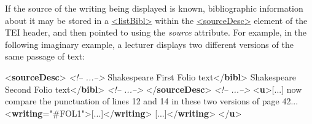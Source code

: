 If the source of the writing being displayed is known, bibliographic information about it may be stored in a \hyperref[TEI.listBibl]{<listBibl>} within the \hyperref[TEI.sourceDesc]{<sourceDesc>} element of the TEI header, and then pointed to using the {\itshape source} attribute. For example, in the following imaginary example, a lecturer displays two different versions of the same passage of text: \par\bgroup{}\exampleFont \begin{shaded}\noindent\mbox{}{<\textbf{sourceDesc}>}\mbox{}\newline 
\textit{<!-- ...-->}\mbox{}\newline 
{}Shakespeare First Folio text{</\textbf{bibl}>}\mbox{}\newline 
{}Shakespeare Second Folio text{</\textbf{bibl}>}\mbox{}\newline 
\textit{<!-- ...-->}\mbox{}\newline 
{</\textbf{sourceDesc}>}\mbox{}\newline 
\textit{<!-- ...-->}\mbox{}\newline 
{<\textbf{u}>}[...] now compare the punctuation of lines 12 and 14 in these two\mbox{}\newline 
 versions of page 42...\mbox{}\newline 
{<\textbf{writing}\hspace*{1em}{source}="{\#FOL1}">}[...]{</\textbf{writing}>}\mbox{}\newline 
{}[...]{</\textbf{writing}>}\mbox{}\newline 
{</\textbf{u}>}\end{shaded}\egroup\par 
